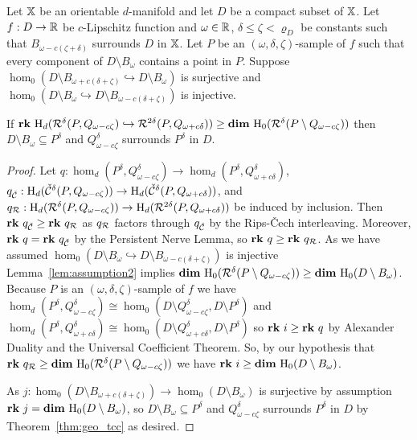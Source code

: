 
\begin{theorem}\label{thm:algo_tcc}
  Let $\mathbb{X}$ be an orientable $d$-manifold and let $D$ be a compact subset of $\mathbb{X}$.
  Let $f : D\to\mathbb{R}$ be $c$-Lipschitz function and $\omega\in\mathbb{R}$, $\delta\leq\zeta < \varrho_D$ be constants such that $B_{\omega - c(\zeta +\delta)}$ surrounds $D$ in $\mathbb{X}$.
  Let $P$ be an $(\omega, \delta,\zeta)$-sample of $f$ such that every component of $D\setminus B_\omega$ contains a point in $P$.
  Suppose $\hom_0(D\setminus B_{\omega+c(\delta+\zeta)}\hookrightarrow D\setminus B_\omega)$ is surjective and $\hom_0(D\setminus B_\omega\hookrightarrow D\setminus B_{\omega-c(\delta+\zeta)})$ is injective.

   If $\mathbf{rk}~\mathrm{H}_d(\mathcal{R}^\delta(P, Q_{\omega -c\zeta})\hookrightarrow \mathcal{R}^{2\delta}(P, Q_{\omega+c\delta})) \geq \mathbf{dim}~\mathrm{H}_0(\mathcal{R}^\delta(P\setminus Q_{\omega-c\zeta}))$ then $D\setminus B_\omega\subseteq P^\delta$ and $Q_{\omega-c\zeta}^\delta$ surrounds $P^\delta$ in $D$.
\end{theorem}
\begin{proof}
  Let $q : \hom_d(P^\delta, Q_{\omega-c\zeta}^\delta)\to \hom_d(P^\delta, Q_{\omega+c\delta}^\delta)$,
  $q_{\check{\mathcal{C}}} : \mathrm{H}_d(\check{\mathcal{C}}^{\delta}(P, Q_{\omega-c\zeta}))\to\mathrm{H}_d(\check{\mathcal{C}}^{\delta}(P, Q_{\omega+c\delta}))$, and
  $q_{\mathcal{R}} : \mathrm{H}_d(\mathcal{R}^{\delta}(P, Q_{\omega-c\zeta}))\to\mathrm{H}_d(\mathcal{R}^{2\delta}(P, Q_{\omega+c\delta}))$ be induced by inclusion.
  Then $\mathbf{rk}~q_{\check{\mathcal{C}}} \geq\mathbf{rk}~q_{\mathcal{R}}$ as $q_{\mathcal{R}}$ factors through $q_{\check{\mathcal{C}}}$ by the Rips-\v Cech interleaving.
  Moreover, $\mathbf{rk}~q = \mathbf{rk}~q_{\check{\mathcal{C}}}$ by the Persistent Nerve Lemma, so $\mathbf{rk}~q\geq \mathbf{rk}~q_{\mathcal{R}}$.
  As we have assumed $\hom_0(D\setminus B_\omega\hookrightarrow D\setminus B_{\omega-c(\delta+\zeta)})$ is injective Lemma~\ref{lem:assumption2} implies $\mathbf{dim}~\mathrm{H}_0(\mathcal{R}^\delta(P\setminus Q_{\omega-c\zeta}))\geq \mathbf{dim}~\mathrm{H}_0(D\setminus B_\omega)$.
  Because $P$ is an $(\omega, \delta, \zeta)$-sample of $f$ we have $\hom_d(P^\delta, Q_{\omega-c\zeta}^\delta)\cong \hom_0(D\setminus Q_{\omega-c\zeta}^\delta, D\setminus P^\delta)$ and $\hom_d(P^\delta, Q_{\omega+c\delta}^\delta)\cong \hom_0(D\setminus Q_{\omega+c\delta}^\delta, D\setminus P^\delta)$ so $\mathbf{rk}~i\geq \mathbf{rk}~q$ by Alexander Duality and the Universal Coefficient Theorem.
  So, by our hypothesis that $\mathbf{rk}~q_{\mathcal{R}}\geq\mathbf{dim}~\mathrm{H}_0(\mathcal{R}^\delta(P\setminus Q_{\omega-c\zeta}))$ we have $\mathbf{rk}~i\geq\mathbf{dim}~\mathrm{H}_0(D\setminus B_\omega)$.

  As $j : \hom_0(D\setminus B_{\omega+c(\delta+\zeta)})\to \hom_0(D\setminus B_\omega)$ is surjective by assumption $\mathbf{rk}~j = \mathbf{dim}~\mathrm{H}_0(D\setminus B_\omega)$, so $D\setminus B_\omega\subseteq P^\delta$ and $Q_{\omega-c\zeta}^\delta$ surrounds $P^\delta$ in $D$ by Theorem~\ref{thm:geo_tcc} as desired.
\end{proof}
